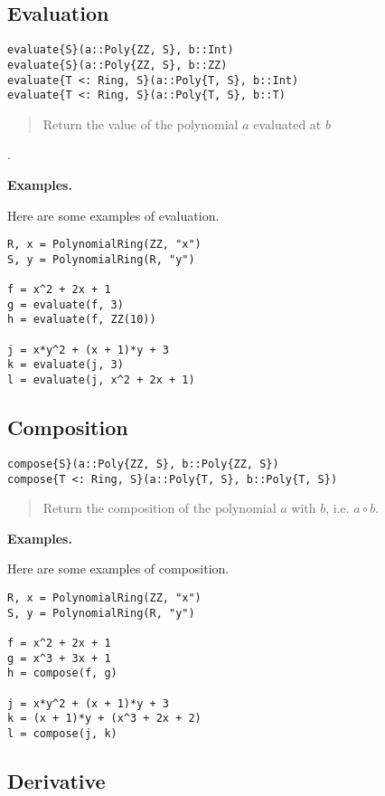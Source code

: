 \documentclass[a4paper,10pt]{article}
\newcommand{\desc}[1]{\vspace{-3mm}\begin{quote}#1\end{quote}}
\begin{document}
{{{\subsection{Evaluation}

\begin{lstlisting}
evaluate{S}(a::Poly{ZZ, S}, b::Int)
evaluate{S}(a::Poly{ZZ, S}, b::ZZ)
evaluate{T <: Ring, S}(a::Poly{T, S}, b::Int)
evaluate{T <: Ring, S}(a::Poly{T, S}, b::T)
\end{lstlisting}

\desc{Return the value of the polynomial $a$ evaluated at $b$}.

\textbf{Examples.}

Here are some examples of evaluation.

\begin{lstlisting}
R, x = PolynomialRing(ZZ, "x")
S, y = PolynomialRing(R, "y")

f = x^2 + 2x + 1
g = evaluate(f, 3)
h = evaluate(f, ZZ(10))

j = x*y^2 + (x + 1)*y + 3
k = evaluate(j, 3)
l = evaluate(j, x^2 + 2x + 1)
\end{lstlisting}

\subsection{Composition}

\begin{lstlisting}
compose{S}(a::Poly{ZZ, S}, b::Poly{ZZ, S})
compose{T <: Ring, S}(a::Poly{T, S}, b::Poly{T, S})
\end{lstlisting}

\desc{Return the composition of the polynomial $a$ with $b$, i.e. $a \circ b$.}

\textbf{Examples.}

Here are some examples of composition.

\begin{lstlisting}
R, x = PolynomialRing(ZZ, "x")
S, y = PolynomialRing(R, "y")

f = x^2 + 2x + 1
g = x^3 + 3x + 1
h = compose(f, g)

j = x*y^2 + (x + 1)*y + 3
k = (x + 1)*y + (x^3 + 2x + 2)
l = compose(j, k)
\end{lstlisting}

\subsection{Derivative}

}}}
\end{document}
